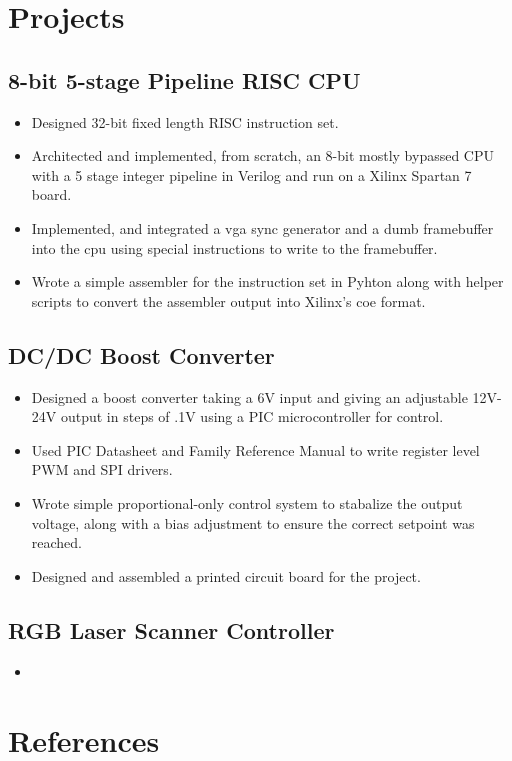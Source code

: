 \documentclass{article}
\begin{document}
\begin{spacing}{.5}
\section{Projects}
	\subsection{8-bit 5-stage Pipeline RISC CPU}
		\begin{itemize}[label=--,itemsep=-.75ex]
			\item \small{Designed 32-bit fixed length RISC instruction set.}
			\item \small{Architected and implemented, from scratch, an 8-bit mostly bypassed CPU with a 5 stage integer pipeline in Verilog and run on a Xilinx Spartan 7 board.}
			\item \small{Implemented, and integrated a vga sync generator and a dumb framebuffer into the cpu using special instructions to write to the framebuffer.}
			\item \small{Wrote a simple assembler for the instruction set in Pyhton along with helper scripts to convert the assembler output into Xilinx's coe format.}

		\end{itemize}
	\subsection{DC/DC Boost Converter}
		\begin{itemize}[label=--,itemsep=-.75ex]
			\item \small{Designed a boost converter taking a 6V input and giving an adjustable 12V-24V output in steps of .1V using a PIC microcontroller for control.}
			\item \small{Used PIC Datasheet and Family Reference Manual to write register level PWM and SPI drivers.}
			\item \small{Wrote simple proportional-only control system to stabalize the output voltage, along with a bias adjustment to ensure the correct setpoint was reached.}
			\item \small{Designed and assembled a printed circuit board for the project.}
		\end{itemize}
	\subsection{RGB Laser Scanner Controller}
		\begin{itemize}[label=--,itemsep=-.75ex]
			\item \small{}
		\end{itemize}

\section{References}

\end{spacing}
\end{document}
